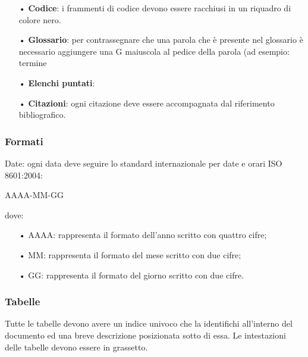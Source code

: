 \begin{itemize}
\item[•] \textbf{Codice}: i frammenti di codice devono essere racchiusi in un riquadro di colore nero.
\item[•] \textbf{Glossario}: per contrassegnare che una parola che è presente nel glossario è necessario aggiungere una G maiuscola al pedice della parola (ad esempio: termine
\item[•] \textbf{Elenchi puntati}:
\item[•] \textbf{Citazioni}: ogni citazione deve essere accompagnata dal riferimento bibliografico.
\end{itemize}


\subsubsection{Formati}
Date: ogni data deve seguire lo standard internazionale per date e orari ISO 8601:2004:
\centerline{AAAA-MM-GG}
dove: 
\begin{itemize}
\item[•] AAAA: rappresenta il formato dell’anno scritto con quattro cifre;
\item[•] MM: rappresenta il formato del mese scritto con due cifre;
\item[•] GG: rappresenta il formato del giorno scritto con due cifre.
\end{itemize}


\subsubsection{Tabelle}
Tutte le tabelle devono avere un indice univoco che la identifichi all’interno del documento ed una breve descrizione posizionata sotto di essa. Le intestazioni delle tabelle devono essere in grassetto.

